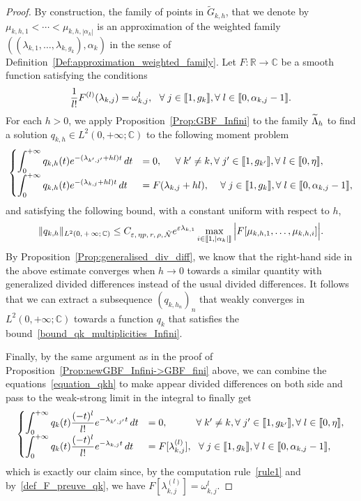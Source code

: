 \documentclass[AHL,Unicode,longabstracts]{cedram}
\newcommand{\llbracket}{\mathopen{[\mkern -2.7mu[}}
\newcommand{\rrbracket}{\mathclose{]\mkern -2.7mu]}}
\newcommand{\inter}[2]{\llbracket #1,#2 \rrbracket}
\newcommand{\n}{g}
\newcommand{\NN}{\mathcal{N}}
\newcommand{\R}{\mathbb{R}}
\newcommand{\C}{\mathbb{C}}
\let\oldtilde\tilde
\renewcommand*{\tilde}[1]{\mathchoice{\widetilde{#1}}{\widetilde{#1}}{\oldtilde{#1}}{\oldtilde{#1}}}\let\oldexists\exists
\renewcommand*{\exists}{\mathrel{\oldexists}}
\let\oldforall\forall
\renewcommand*{\forall}{\mathrel{\oldforall}}
\begin{document}
\begin{proof}
By construction, the family of points in $\widetilde{G}_{k,h}$, that we denote by $\mu_{k,h,1} < \dotsm < \mu_{k,h,|\alpha_k|}$ is an approximation of the weighted family $((\lambda_{k,1},\dotsc,\lambda_{k,\n_k}), \alpha_k)$ in the sense of Definition~\ref{Def:approximation_weighted_family}. Let $F:\R\to \C$ be a smooth function satisfying the conditions
\begin{equation}\label{def_F_preuve_qk}
\frac{1}{l!} F^{(l)} (\lambda_{k,j}) = \omega_{k,j}^l, \ \ \forall j\in \inter{1}{\n_k}, \forall l\in \inter{0}{\alpha_{k,j}-1}.
\end{equation}
For each $h>0$, we apply Proposition~\ref{Prop:GBF_Infini} to the family $\tilde{\Lambda}_h$ to find a solution $q_{k,h}\in L^2(0,+\infty;\C)$ to the following moment problem
\begin{equation}\label{equation_qkh}
\begin{cases}
\displaystyle\int_0^{+\infty} q_{k,h}(t) e^{-(\lambda_{k',j'} + hl) t} \, dt & = 0, \mkern25mu \forall k'\neq k, \forall j'\in \inter{1}{\n_{k'}}, \forall l\in \inter{0}{\eta},\\[0.15em]
\displaystyle\int_0^{+\infty} q_{k,h}(t) e^{-(\lambda_{k,j}+hl) t} \, dt & = F(\lambda_{k,j}+hl), \quad\, \forall j\in \inter{1}{\n_{k}}, \forall l\in \inter{0}{\alpha_{k,j}-1},
\end{cases}
\end{equation}
and satisfying the following bound, with a constant uniform with respect to $h$,
\[
\|q_{k,h}\|_{L^2(0,\,+\,\infty;\,\C)} \leq C_{\varepsilon,\, \eta p,\,r,\, \rho,\, \tilde{\NN}} e^{\varepsilon \lambda_{k,1}} \max \limits_{i\in \inter{1}{|\alpha_k|}} \Big| F[\mu_{k,h,1}, \dots, \mu_{k,h,i}] \Big|.
\]
By Proposition~\ref{Prop:generalised_div_diff}, we know that the right-hand side in the above estimate converges when $h\to 0$ towards a similar quantity with generalized divided differences instead of the usual divided differences. It follows that we can extract a subsequence $(q_{k,h_n})_n$ that weakly converges in $L^2(0,+\infty;\C)$ towards a function $q_k$ that satisfies the bound~\eqref{bound_qk_multiplicities_Infini}.

Finally, by the same argument as in the proof of Proposition~\ref{Prop:newGBF_Infini->GBF_fini} above, we can combine the equations~\eqref{equation_qkh} to make appear divided differences on both side and pass to the weak-strong limit in the integral to finally get
\begin{equation*}\label{equation_qk}
\begin{cases}
\displaystyle\int_0^{+\infty} q_{k}(t) \frac{(-t)^l}{l!} e^{-\lambda_{k',j'}t} \, dt & = 0, \mkern53mu \forall k'\neq k, \forall j'\in \inter{1}{\n_{k'}}, \forall l\in \inter{0}{\eta},\\[0.15em]
\displaystyle\int_0^{+\infty} q_{k}(t) \frac{(-t)^l}{l!} e^{-\lambda_{k,j}t} \, dt & = F[\lambda_{k,j}^{(l)}], \ \ \forall j\in \inter{1}{\n_{k}}, \forall l\in \inter{0}{\alpha_{k,j}-1},
\end{cases}
\end{equation*}
which is exactly our claim since, by the computation rule~\eqref{rule1} and by~\eqref{def_F_preuve_qk}, we have $F[\lambda_{k,j}^{(l)}] = \omega_{k,j}^l$.
\end{proof}
\end{document}
